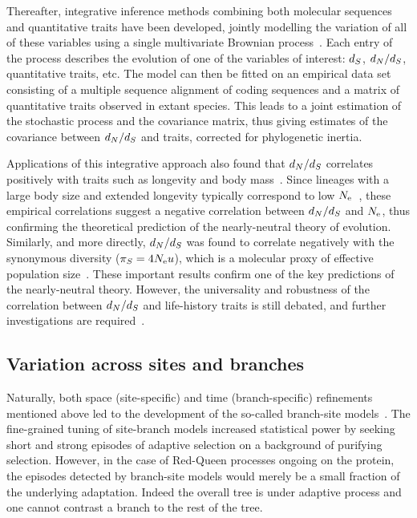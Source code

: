 Thereafter, integrative inference methods combining both molecular sequences and quantitative traits have been developed, jointly modelling the variation of all of these variables using a single multivariate Brownian process~\citep{Lartillot2011}.
Each entry of the process describes the evolution of one of the variables of interest: $d_S$, $d_N / d_S$, quantitative traits, etc.
The model can then be fitted on an empirical data set consisting of a multiple sequence alignment of coding sequences and a matrix of quantitative traits observed in extant species.
This leads to a joint estimation of the stochastic process and the covariance matrix, thus giving estimates of the covariance between $d_N / d_S$ and traits, corrected for phylogenetic inertia.

Applications of this integrative approach also found that $d_N / d_S$ correlates positively with traits such as longevity and body mass~\citep{Lartillot2011, Figuet2017}.
Since lineages with a large body size and extended longevity typically correspond to low $N_{\text{e}}$~\citep{Romiguier2014}, these empirical correlations suggest a negative correlation between $d_N / d_S$ and $N_{\text{e}}$, thus confirming the theoretical prediction of the \gls{nearly-neutral} theory of evolution.
Similarly, and more directly, $d_N / d_S$ was found to correlate negatively with the \gls{synonymous} diversity ($\pi_S = 4 N_{\text{e}} u$), which is a molecular proxy of effective population size~\citep{Brevet2019}.
These important results confirm one of the key predictions of the \gls{nearly-neutral} theory.
However, the universality and robustness of the correlation between $d_N / d_S$ and life-history traits is still debated, and further investigations are required~\citep{Nabholz2013,Lanfear2014,Figuet2016, Bolivar2019}.

\subsection{Variation across sites and branches}
\label{subsec:variation-across-sites-and-branches}

Naturally, both space (site-specific) and time (branch-specific) refinements mentioned above led to the development of the so-called branch-site models~\citep{Yang2002a, Zhang2004, Pond2011, Murrell2012, Murrell2013}.
The fine-grained tuning of site-branch models increased statistical power by seeking short and strong episodes of adaptive selection on a background of purifying selection.
However, in the case of Red-Queen processes ongoing on the protein, the episodes detected by branch-site models would merely be a small fraction of the underlying adaptation.
Indeed the overall tree is under adaptive process and one cannot contrast a branch to the rest of the tree.


